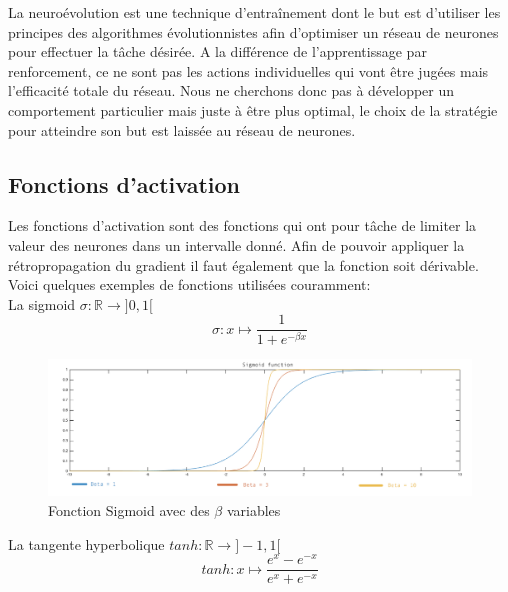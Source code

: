 \documentclass{article}
\begin{document}
La neuroévolution est une technique d'entraînement dont le but est d'utiliser les principes des algorithmes évolutionnistes afin d'optimiser un réseau de neurones pour effectuer la tâche désirée. A la différence de l'apprentissage par renforcement, ce ne sont pas les actions individuelles qui vont être jugées mais l'efficacité totale du réseau. Nous ne cherchons donc pas à développer un comportement particulier mais juste à être plus optimal, le choix de la stratégie pour atteindre son but est laissée au réseau de neurones\cite{wikineuroevolution}.\\

\subsection{Fonctions d'activation}

Les fonctions d'activation sont des fonctions qui ont pour tâche de limiter la valeur des neurones dans un intervalle donné. Afin de pouvoir appliquer la rétropropagation du gradient il faut également que la fonction soit dérivable.
Voici quelques exemples de fonctions utilisées couramment:\\

La sigmoid $\sigma : \mathbb{R} \rightarrow ]0, 1[$
\begin{equation}
	\sigma : x \mapsto \frac{1}{1 + e^{-\beta x}}
\end{equation}

\begin{figure}[H]
\begin{center}
	\includegraphics[scale=0.4]{sigmoid.png} 
	\caption{Fonction Sigmoid avec des $\beta$ variables}
\end{center}
\end{figure}

La tangente hyperbolique $tanh : \mathbb{R} \rightarrow ]-1, 1[$
\begin{equation}
	tanh : x \mapsto \frac{e^x - e^{-x}}{e^x + e^{-x}}
\end{equation}
\end{document}
